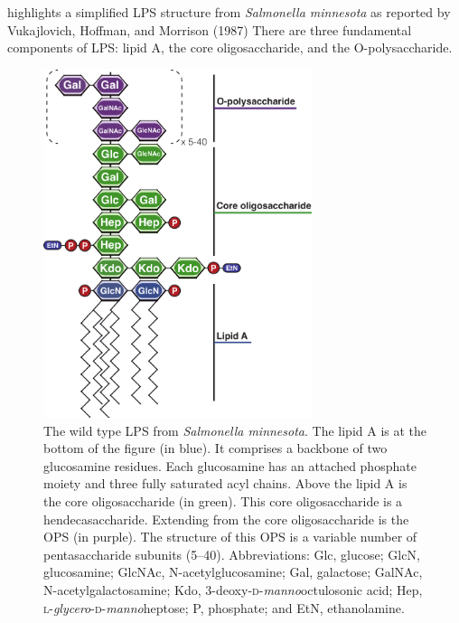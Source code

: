  highlights a simplified \ac{LPS} structure from \textit{Salmonella minnesota} as reported by Vukajlovich, Hoffman, and Morrison
(1987) There are three fundamental components of \ac{LPS}: lipid A, the core oligosaccharide, and the O-polysaccharide.
\begin{figure}[p]
  	\begin{center}
   		\includegraphics[width=0.7\textwidth]{intro/img/lpsoverview.pdf}
   	\end{center}
   	\caption[Simplified structure of \ac{LPS} from \textit{Salmonella minnesota}]{ The wild type \ac{LPS} from \textit{Salmonella minnesota}. The lipid A is at the bottom of the
figure (in blue). It comprises a backbone of two glucosamine residues. Each glucosamine has an attached phosphate moiety and three fully saturated acyl chains. Above the lipid A is
the core oligosaccharide (in green). This core oligosaccharide is a hendecasaccharide. Extending from the core oligosaccharide is the \ac{OPS} (in purple). The structure of this
\ac{OPS} is a variable number of pentasaccharide subunits (5--40). Abbreviations: Glc, glucose; GlcN, glucosamine; GlcNAc, N-acetylglucosamine; Gal, galactose; GalNAc,
N-acetylgalactosamine; Kdo, 3-deoxy-\textsc{d}-\textit{manno}octulosonic acid; Hep, \textsc{l}-\textit{glycero}-\textsc{d}-\textit{manno}heptose; P, phosphate; and EtN,
ethanolamine. }
   	\label{fig:lpsoverview}
\end{figure}

